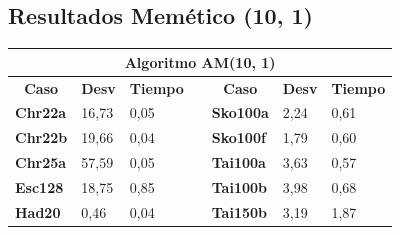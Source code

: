 \documentclass[a4paper, 12pt]{article}
\begin{document}
      
      
      \newpage
      \subsection{Resultados Memético (10, 1)}
      \begin{table}[H]
\centering
\label{my-label}
\begin{tabular}{|l|l|l|l|l|l|l|}
\hline
\multicolumn{7}{|c|}{\textbf{Algoritmo AM(10, 1)}}                                                                                                                                                                                                                \\ \hline
\multicolumn{1}{|c|}{\textbf{Caso}} & \multicolumn{1}{c|}{\textbf{Desv}} & \multicolumn{1}{c|}{\textbf{Tiempo}} & \multicolumn{1}{c|}{\textbf{}} & \multicolumn{1}{c|}{\textbf{Caso}} & \multicolumn{1}{c|}{\textbf{Desv}} & \multicolumn{1}{c|}{\textbf{Tiempo}} \\ \cline{1-3} \cline{5-7} 
\textbf{Chr22a}                     & 16,73                              & 0,05                                 &                                & \textbf{Sko100a}                   & 2,24                               & 0,61                                 \\ \cline{1-3} \cline{5-7} 
\textbf{Chr22b}                     & 19,66                              & 0,04                                 &                                & \textbf{Sko100f}                   & 1,79                               & 0,60                                 \\ \cline{1-3} \cline{5-7} 
\textbf{Chr25a}                     & 57,59                              & 0,05                                 &                                & \textbf{Tai100a}                   & 3,63                               & 0,57                                 \\ \cline{1-3} \cline{5-7} 
\textbf{Esc128}                     & 18,75                              & 0,85                                 &                                & \textbf{Tai100b}                   & 3,98                               & 0,68                                 \\ \cline{1-3} \cline{5-7} 
\textbf{Had20}                      & 0,46                               & 0,04                                 &                                & \textbf{Tai150b}                   & 3,19                               & 1,87                                 \\ \cline{1-3} \cline{5-7} 

\end{tabular}
\end{table}
\end{document}

